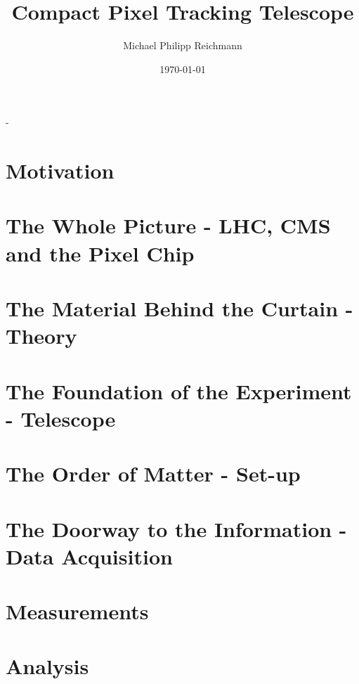 \documentclass[british,11pt,a4paper]{memoir}
\title{Compact Pixel Tracking Telescope}
\author{Michael Philipp Reichmann}
\date{\today}
\begin{document}
\frontmatter
\begin{titlingpage}
  \calccentering{\unitlength}
  \begin{adjustwidth*}{\unitlength-24pt}{-\unitlength-24pt}
    \maketitle
  \end{adjustwidth*}
\end{titlingpage}

\cleartorecto
\tableofcontents
\mainmatter
\chapter{Motivation}
\chapter{The Whole Picture - LHC, CMS and the Pixel Chip}

\chapter{The Material Behind the Curtain - Theory}
\chapter{The Foundation of the Experiment - Telescope}

\chapter{The Order of Matter - Set-up}
\chapter{The Doorway to the Information - Data Acquisition}

\chapter{Measurements}
\chapter{Analysis}
\end{document}
